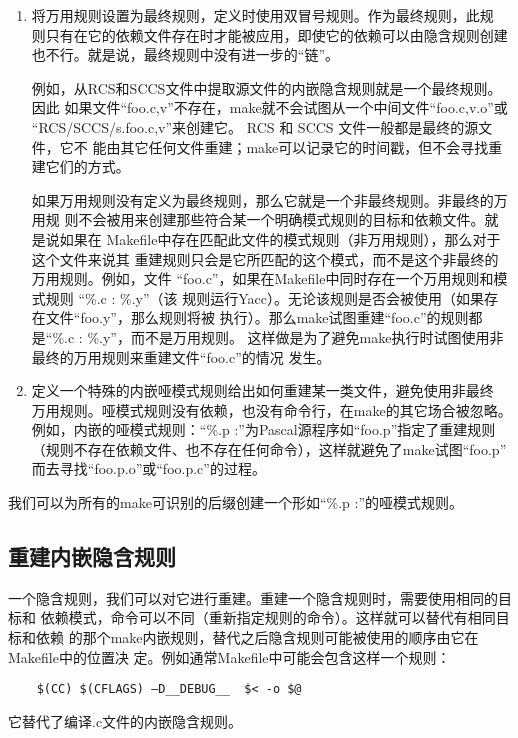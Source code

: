 \begin{enumerate}
\itemsep=4pt \parskip=2pt
  \item 将万用规则设置为最终规则，定义时使用双冒号规则。作为最终规则，此规
      则只有在它的依赖文件存在时才能被应用，即使它的依赖可以由隐含规则创建
      也不行。就是说，最终规则中没有进一步的“链”。

      例如，从RCS和SCCS文件中提取源文件的内嵌隐含规则就是一个最终规则。因此
  如果文件“foo.c,v”不存在，make就不会试图从一个中间文件“foo.c,v.o”或
  “RCS/SCCS/s.foo.c,v”来创建它。 RCS 和 SCCS 文件一般都是最终的源文件，它不
  能由其它任何文件重建；make可以记录它的时间戳，但不会寻找重建它们的方式。

  如果万用规则没有定义为最终规则，那么它就是一个非最终规则。非最终的万用规
  则不会被用来创建那些符合某一个明确模式规则的目标和依赖文件。就是说如果在
  Makefile中存在匹配此文件的模式规则（非万用规则），那么对于这个文件来说其
  重建规则只会是它所匹配的这个模式，而不是这个非最终的万用规则。例如，文件
  “foo.c”，如果在Makefile中同时存在一个万用规则和模式规则 “\%.c : \%.y”（该
  规则运行Yacc）。无论该规则是否会被使用（如果存在文件“foo.y”，那么规则将被
  执行）。那么make试图重建“foo.c”的规则都是“\%.c : \%.y”，而不是万用规则。
  这样做是为了避免make执行时试图使用非最终的万用规则来重建文件“foo.c”的情况
  发生。
  \item 定义一个特殊的内嵌哑模式规则给出如何重建某一类文件，避免使用非最终
      万用规则。哑模式规则没有依赖，也没有命令行，在make的其它场合被忽略。
      例如，内嵌的哑模式规则：“\%.p :”为Pascal源程序如“foo.p”指定了重建规则
      （规则不存在依赖文件、也不存在任何命令），这样就避免了make试图“foo.p”
      而去寻找“foo.p.o”或“foo.p.c”的过程。
\end{enumerate}

我们可以为所有的make可识别的后缀创建一个形如“\%.p :”的哑模式规则。

\subsection{重建内嵌隐含规则}
一个隐含规则，我们可以对它进行重建。重建一个隐含规则时，需要使用相同的目标和
依赖模式，命令可以不同（重新指定规则的命令）。这样就可以替代有相同目标和依赖
的那个make内嵌规则，替代之后隐含规则可能被使用的顺序由它在Makefile中的位置决
定。例如通常Makefile中可能会包含这样一个规则：

\begin{Verbatim}[]
%.o : %.c
    $(CC) $(CFLAGS) –D__DEBUG__  $< -o $@
\end{Verbatim}
\noindent 它替代了编译.c文件的内嵌隐含规则。

